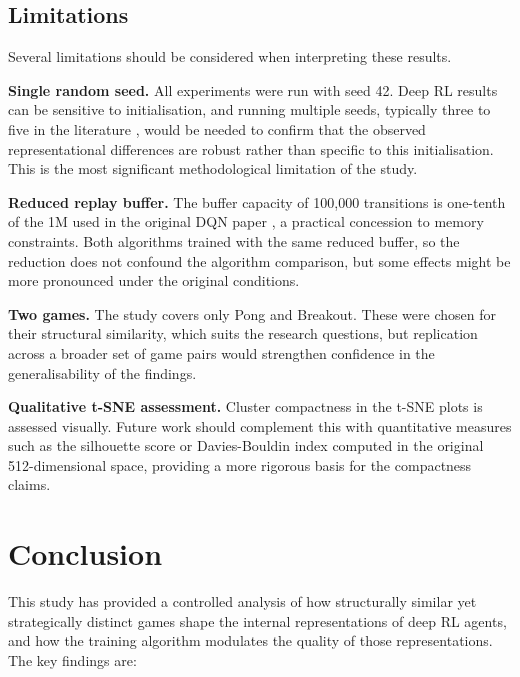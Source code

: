 \documentclass[a4paper]{article}
\begin{document}
\subsection{Limitations}

Several limitations should be considered when interpreting these results.

\textbf{Single random seed.} All experiments were run with seed 42. Deep RL results can be sensitive to initialisation, and running multiple seeds, typically three to five in the literature \cite{henderson2018deep}, would be needed to confirm that the observed representational differences are robust rather than specific to this initialisation. This is the most significant methodological limitation of the study.

\textbf{Reduced replay buffer.} The buffer capacity of 100,000 transitions is one-tenth of the 1M used in the original DQN paper \cite{mnih2015human}, a practical concession to memory constraints. Both algorithms trained with the same reduced buffer, so the reduction does not confound the algorithm comparison, but some effects might be more pronounced under the original conditions.

\textbf{Two games.} The study covers only Pong and Breakout. These were chosen for their structural similarity, which suits the research questions, but replication across a broader set of game pairs would strengthen confidence in the generalisability of the findings.

\textbf{Qualitative t-SNE assessment.} Cluster compactness in the t-SNE plots is assessed visually. Future work should complement this with quantitative measures such as the silhouette score or Davies-Bouldin index computed in the original 512-dimensional space, providing a more rigorous basis for the compactness claims.

\section{Conclusion}
\label{sec:conclusion}

This study has provided a controlled analysis of how structurally similar yet strategically distinct games shape the internal representations of deep RL agents, and how the training algorithm modulates the quality of those representations. The key findings are:
\end{document}
